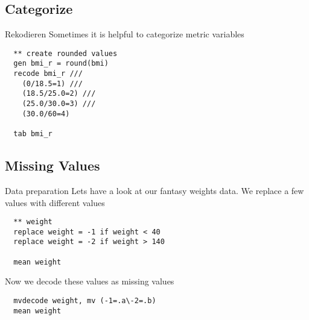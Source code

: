 \subsection{Categorize} 
\begin{frame}[fragile]{Rekodieren}   
Sometimes it is helpful to categorize metric variables
\begin{lstlisting}
  ** create rounded values
  gen bmi_r = round(bmi)
  recode bmi_r ///
    (0/18.5=1) ///
    (18.5/25.0=2) ///
    (25.0/30.0=3) ///
    (30.0/60=4)
    
  tab bmi_r
\end{lstlisting}

\end{frame}

\subsection{Missing Values}
\begin{frame}[fragile]{Data preparation}   
Lets have a look at our fantasy weights data. We replace a few values with different values
\begin{lstlisting}  
  ** weight
  replace weight = -1 if weight < 40
  replace weight = -2 if weight > 140
  
  mean weight  
\end{lstlisting}
Now we decode these values as missing values
\begin{lstlisting}
  mvdecode weight, mv (-1=.a\-2=.b)
  mean weight
\end{lstlisting}


\end{frame}


